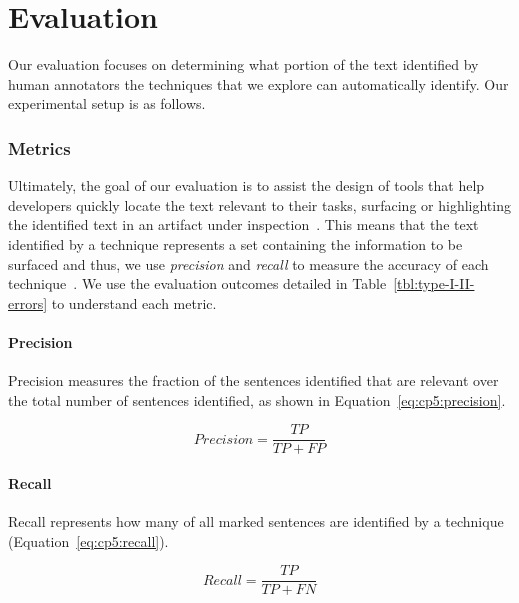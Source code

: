 \section{Evaluation}
\label{cp5:evaluation}


Our evaluation focuses 
on determining what portion of the text identified by human annotators the techniques that we explore can automatically identify.
Our experimental setup is as follows.



\subsubsection{Metrics}


Ultimately, the goal of our evaluation is to assist the design of tools that help developers quickly locate the text relevant to their tasks, surfacing or highlighting the identified text in an artifact under inspection~\cite{Robillard2015}.
This means that the text identified by a technique represents a set containing the information to be surfaced and thus, 
we use \textit{precision} and \textit{recall} to measure the accuracy of each technique~\cite{Manning2009IR}.
We use the evaluation outcomes detailed in Table~\ref{tbl:type-I-II-errors} to understand each metric.

\medskip




\paragraph{\textbf{Precision}}

Precision measures the fraction of the sentences identified that are relevant over the total number of sentences identified, as shown in Equation~\ref{eq:cp5:precision}.



\begin{equation}
\label{eq:cp5:precision}    
    Precision = \frac{TP}{TP + FP}
\end{equation}


\paragraph{\textbf{Recall}} Recall represents how many of all marked sentences are identified by a technique (Equation~\ref{eq:cp5:recall}).


\begin{equation}
\label{eq:cp5:recall}        
    Recall = \frac{TP}{TP + FN}
\end{equation}



